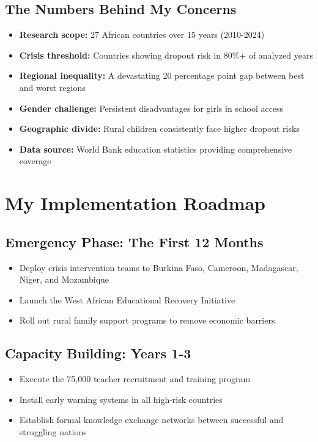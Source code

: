 \documentclass[12pt,a4paper]{article}
\begin{document}
\subsection{The Numbers Behind My Concerns}

\begin{itemize}
    \item \textbf{Research scope:} 27 African countries over 15 years (2010-2024)
    \item \textbf{Crisis threshold:} Countries showing dropout risk in 80\%+ of analyzed years
    \item \textbf{Regional inequality:} A devastating 20 percentage point gap between best and worst regions
    \item \textbf{Gender challenge:} Persistent disadvantages for girls in school access
    \item \textbf{Geographic divide:} Rural children consistently face higher dropout risks
    \item \textbf{Data source:} World Bank education statistics providing comprehensive coverage
\end{itemize}

\section{My Implementation Roadmap}

\subsection{Emergency Phase: The First 12 Months}
\begin{itemize}
    \item Deploy crisis intervention teams to Burkina Faso, Cameroon, Madagascar, Niger, and Mozambique
    \item Launch the West African Educational Recovery Initiative
    \item Roll out rural family support programs to remove economic barriers
\end{itemize}

\subsection{Capacity Building: Years 1-3}
\begin{itemize}
    \item Execute the 75,000 teacher recruitment and training program
    \item Install early warning systems in all high-risk countries
    \item Establish formal knowledge exchange networks between successful and struggling nations
\end{itemize}
\end{document}
